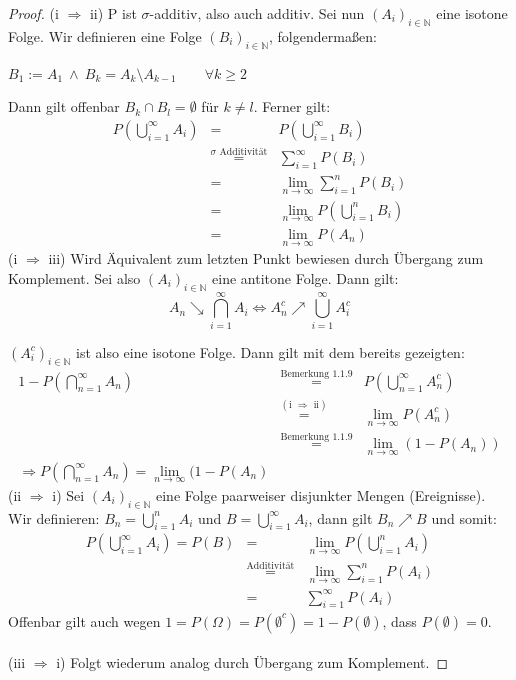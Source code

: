 \documentclass[10pt,a4paper]{report}
\numberwithin{equation}{section}
\numberwithin{figure}{section}
\theoremstyle{plain}
\theoremstyle{definition}
\theoremstyle{remark}
\theoremstyle{plain}
\newcommand{\1}{ \mathbb{1} } %
\begin{document}
\begin{proof}
  (i $\Rightarrow$ ii) P ist $\sigma$-additiv, also auch additiv. Sei
  nun $(A_i)_{i \in \mathbb{N}}$ eine isotone Folge. Wir definieren
  eine Folge $(B_i)_{i \in \mathbb{N}}$, folgendermaßen:
  \begin{center}
    $B_1:=A_1 ~\wedge~ B_k=A_k\setminus A_{k-1} \qquad \forall k \geq
    2 $
  \end{center}
  Dann gilt offenbar $B_k\cap B_l=\emptyset$ für $k\neq l$. Ferner
  gilt:
  \begin{eqnarray*}
    P\left(\bigcup\limits_{i=1}^\infty A_i\right)&=&P\left(\bigcup\limits_{i=1}^\infty B_i\right)\\
    &\overset{\sigma \text{ Additivität}}{=}&\sum\limits_{i=1}^\infty P(B_i)\\
    &=& \lim\limits_{n \to \infty}\sum\limits_{i=1}^n P(B_i)\\ 
    &=& \lim\limits_{n \to \infty} P\left(\bigcup\limits_{i=1}^n B_i\right)\\
    &=& \lim\limits_{n \to \infty} P(A_n)
  \end{eqnarray*}
  (i $\Rightarrow$ iii) Wird Äquivalent zum letzten Punkt bewiesen
  durch Übergang zum Komplement. Sei also $(A_i)_{i \in \mathbb{N}}$
  eine antitone Folge. Dann gilt:
  \[A_n \searrow
  \bigcap\limits_{i=1}^\infty A_i \Leftrightarrow A_n^c \nearrow
  \bigcup\limits_{i=1}^\infty A_i^c\]

  $(A_i^c)_{i \in \mathbb{N}}$ ist also eine isotone Folge. Dann gilt
  mit dem bereits gezeigten:
  \begin{eqnarray*}
    1-P\left(\bigcap\limits_{n=1}^\infty A_n\right)&\overset{\text{Bemerkung 1.1.9}}{=}&P\left(\bigcup\limits_{n=1}^\infty A_n^c\right)\\
    &\overset{(\text{i } \Rightarrow \text{ ii})}{=}&\lim\limits_{n \to \infty}P(A_n^c)\\
    &\overset{\text{Bemerkung 1.1.9}}{=}&\lim\limits_{n \to \infty}(1-P(A_n))\\
    \Rightarrow P\left(\bigcap\limits_{n=1}^\infty A_n\right)=\lim\limits_{n \to \infty}(1-P(A_n)
  \end{eqnarray*} 
  (ii $\Rightarrow$ i) Sei $(A_i)_{i\in \mathbb{N}}$ eine Folge
  paarweiser disjunkter Mengen (Ereignisse). Wir definieren:
  $B_n=\bigcup\limits_{i=1}^n A_i$ und $B=\bigcup\limits_{i=1}^\infty
  A_i$, dann gilt $B_n \nearrow B$ und somit:
  \begin{eqnarray*}
    P\left(\bigcup\limits_{i=1}^\infty A_i\right)=P(B)&=&\lim\limits_{n \to \infty}P\left(\bigcup\limits_{i=1}^n A_i\right)\\
    &\overset{\text{Additivität}}{=}& \lim\limits_{n \to \infty}\sum\limits_{i=1}^n P(A_i)\\
    &=& \sum\limits_{i=1}^\infty P(A_i)
  \end{eqnarray*} 
  Offenbar gilt auch wegen $1=P(\Omega)=P(\emptyset^c)=1-P(\emptyset)$, dass $P(\emptyset)=0$.\\\\
  (iii $\Rightarrow$ i) Folgt wiederum analog durch Übergang zum
  Komplement.
\end{proof}
\end{document}
